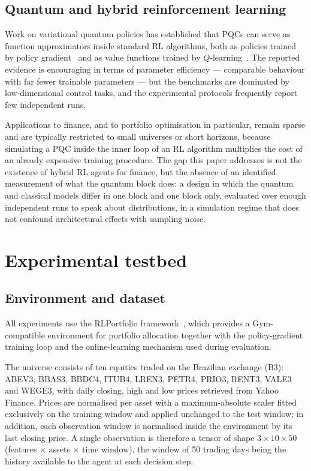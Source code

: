 \documentclass[aps,floatfix,superscriptaddress,twocolumn,tightenlines,amsmath,amssymb,nofootinbib,10pt,longbibliography,prl]{revtex4-2}
\begin{document}
\subsection{Quantum and hybrid reinforcement learning}
\label{subsec:bg-qrl}

Work on variational quantum policies has established that PQCs can serve as
function approximators inside standard RL algorithms, both as policies trained
by policy gradient~\cite{jerbi2021} and as value functions trained by
$Q$-learning~\cite{skolik2022}. The reported evidence is encouraging in terms of
parameter efficiency --- comparable behaviour with far fewer trainable
parameters --- but the benchmarks are dominated by low-dimensional control
tasks, and the experimental protocols frequently report few independent runs.

Applications to finance, and to portfolio optimisation in particular, remain
sparse and are typically restricted to small universes or short horizons,
because simulating a PQC inside the inner loop of an RL algorithm multiplies the
cost of an already expensive training procedure. The gap this paper addresses is
not the existence of hybrid RL agents for finance, but the absence of an
identified measurement of what the quantum block does: a design in which the
quantum and classical models differ in one block and one block only, evaluated
over enough independent runs to speak about distributions, in a simulation
regime that does not confound architectural effects with sampling noise.


\section{Experimental testbed}
\label{sec:testbed}

\subsection{Environment and dataset}
\label{subsec:dataset}

All experiments use the RLPortfolio framework~\cite{RLportfolio}, which provides
a Gym-compatible environment for portfolio allocation together with the
policy-gradient training loop and the online-learning mechanism used during
evaluation.

The universe consists of ten equities traded on the Brazilian exchange (B3):
ABEV3, BBAS3, BBDC4, ITUB4, LREN3, PETR4, PRIO3, RENT3, VALE3 and WEGE3, with
daily closing, high and low prices retrieved from Yahoo Finance. Prices are
normalised per asset with a maximum-absolute scaler fitted exclusively on the
training window and applied unchanged to the test window; in addition, each
observation window is normalised inside the environment by its last closing
price. A single observation is therefore a tensor of shape
$3 \times 10 \times 50$ (features $\times$ assets $\times$ time window), the
window of \num{50} trading days being the history available to the agent at each
decision step.
\end{document}
